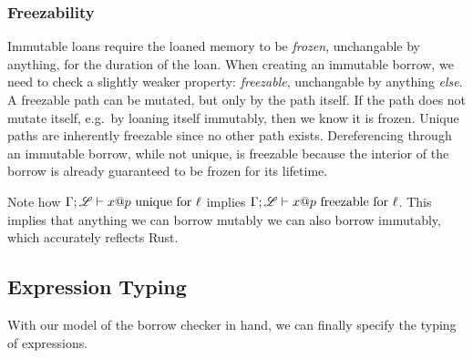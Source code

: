 \subsubsection*{Freezability}
Immutable loans require the loaned memory to be \emph{frozen}, 
unchangable by anything, for the duration of the loan.
When creating an immutable borrow, we need to check a slightly weaker property:
\emph{freezable}, unchangable by anything \emph{else}.
A freezable path can be mutated, but only by the path itself.
If the path does not mutate itself, e.g.\ by loaning itself immutably, then we know it is frozen.
Unique paths are inherently freezable since no other path exists.
Dereferencing through an immutable borrow, while not unique, is freezable because
the interior of the borrow is already guaranteed to be frozen for its lifetime.
\newline



Note how ${\Gamma};{\mathscr{L}}\vdash{{x}@{p}}\ \textrm{unique for}\ {\ell}$ implies ${\Gamma};{\mathscr{L}}\vdash{{x}@{p}}\ \textrm{freezable for}\ {\ell}$.
This implies that anything we can borrow mutably we can also borrow immutably,
which accurately reflects Rust.

\subsection*{Expression Typing}
With our model of the borrow checker in hand, we can finally specify the typing of expressions.
\newline

\newline

